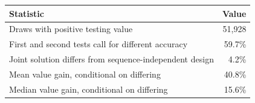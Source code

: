 \begin{tabular}{lr}
\toprule
Statistic & Value \\
\midrule
Draws with positive testing value & 51,928 \\
First and second tests call for different accuracy & 59.7\% \\
Joint solution differs from sequence-independent design & 4.2\% \\
Mean value gain, conditional on differing & 40.8\% \\
Median value gain, conditional on differing & 15.6\% \\
\bottomrule
\end{tabular}
